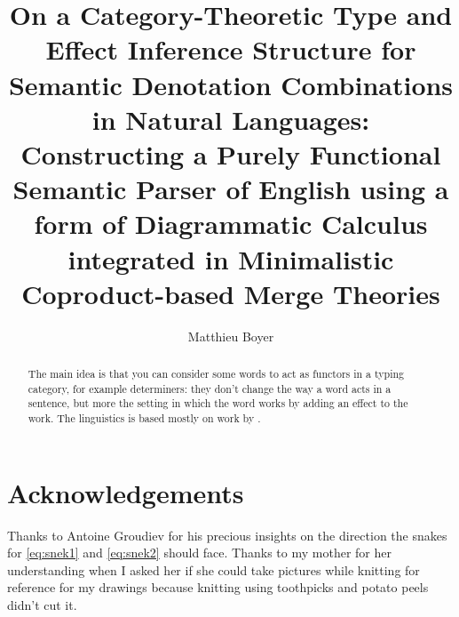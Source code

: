 \documentclass[math, english, info]{tcart}
\title{On a Category-Theoretic Type and Effect Inference Structure for Semantic Denotation Combinations in Natural Languages:\\ Constructing a Purely Functional Semantic Parser of English using a form of Diagrammatic Calculus integrated in Minimalistic Coproduct-based Merge Theories}
\author{Matthieu Boyer}
\begin{document}
\maketitle
\tableofcontents

\begin{abstract}
	The main idea is that you can consider some words to act as functors in a typing category, for example determiners:
	they don't change the way a word acts in a sentence,
	but more the setting in which the word works by adding an effect to the work.
	The linguistics is based mostly on work by .
\end{abstract}










\section*{Acknowledgements}
Thanks to Antoine Groudiev for his precious insights on the direction the
snakes for \eqref{eq:snek1} and \eqref{eq:snek2} should face.
Thanks to my mother for her understanding when I asked her if she could take
pictures while knitting for reference for my drawings because knitting using
toothpicks and potato peels didn't cut it.

\clearpage
\appendix








\end{document}
